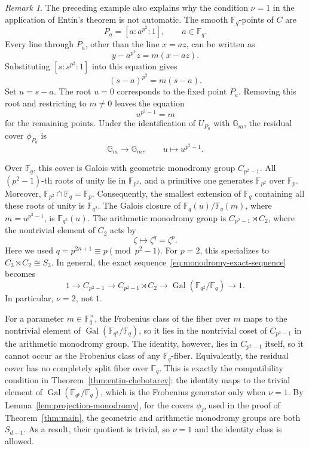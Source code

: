 \documentclass[12pt,reqno]{amsart}
\theoremstyle{definition}
\theoremstyle{remark}
\newtheorem{remark}[theorem]{Remark}
\newcommand{\bF}{\mathbb{F}}
\newcommand{\Fp}{\mathbb{F}_p}
\newcommand{\Fq}{\mathbb{F}_q}
\begin{document}
\begin{remark}\label{rem:monodromy-obstruction}
The preceding example also explains why the condition $\nu=1$ in the
application of Entin's theorem is not automatic. The smooth $\Fq$-points
of $C$ are
\[
P_a=[a:a^{p^2}:1],
\qquad
a\in\Fq.
\]
Every line through $P_a$, other than the line $x=az$, can be written as
\[
y-a^{p^2}z=m(x-az).
\]
Substituting $[s:s^{p^2}:1]$ into this equation gives
\[
(s-a)^{p^2}=m(s-a).
\]
Set $u=s-a$. The root $u=0$ corresponds to the fixed point $P_a$.
Removing this root and restricting to $m\neq0$ leaves the equation
\[
u^{p^2-1}=m
\]
for the remaining points. Under the identification of $U_{P_a}$ with $\mathbb G_m$, the residual cover $\phi_{P_a}$ is
\[
\mathbb G_m\longrightarrow\mathbb G_m, \qquad u\longmapsto u^{p^2-1}.
\]

Over $\overline{\Fq}$, this cover is Galois with geometric monodromy
group $C_{p^2-1}$. All $(p^2-1)$-th roots of unity lie in
$\bF_{p^2}$, and a primitive one generates $\bF_{p^2}$ over $\Fp$.
Moreover, $\bF_{p^2}\cap\Fq=\Fp$. Consequently, the smallest extension of $\Fq$ containing all these
roots of unity is $\bF_{q^2}$. The Galois closure of
$\Fq(u)/\Fq(m)$, where $m=u^{p^2-1}$, is $\bF_{q^2}(u)$. The arithmetic monodromy group is $C_{p^2-1}\rtimes C_2$, where the nontrivial element of $C_2$ acts by
\[
\zeta\longmapsto\zeta^q=\zeta^p.
\]
Here we used $q=p^{2n+1}\equiv p\pmod{p^2-1}$.
For $p=2$, this specializes to
$C_3\rtimes C_2\cong S_3$. In general, the exact
sequence~\eqref{eq:monodromy-exact-sequence} becomes
\[
1\longrightarrow C_{p^2-1}
\longrightarrow C_{p^2-1}\rtimes C_2
\longrightarrow \operatorname{Gal}(\bF_{q^2}/\Fq)
\longrightarrow 1.
\]
In particular, $\nu=2$, not $1$.

For a parameter $m\in\Fq^\times$, the Frobenius class of the fiber over $m$ maps to the nontrivial element of
$\operatorname{Gal}(\bF_{q^2}/\Fq)$, so it lies in the nontrivial coset of $C_{p^2-1}$ in the arithmetic monodromy group. The identity, however, lies in $C_{p^2-1}$ itself, so it cannot occur as the Frobenius class of any $\Fq$-fiber. Equivalently, the residual cover has no completely split fiber over $\Fq$. This is exactly the compatibility condition in Theorem~\ref{thm:entin-chebotarev}: the identity maps to the trivial element of $\operatorname{Gal}(\bF_{q^\nu}/\Fq)$, which is the Frobenius generator only when $\nu=1$. By
Lemma~\ref{lem:projection-monodromy}, for the covers $\phi_P$ used in the proof of Theorem~\ref{thm:main}, the geometric and arithmetic monodromy groups are both $S_{d-1}$. As a result, their quotient is trivial, so $\nu=1$ and the identity class is allowed.
\end{remark}
\end{document}
